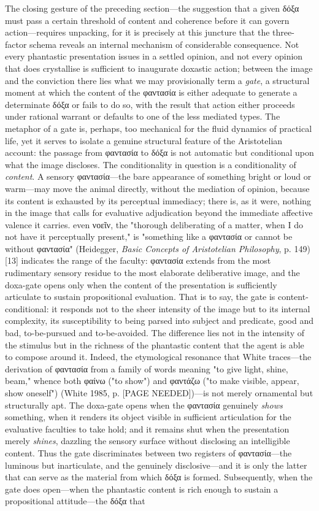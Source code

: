 \documentclass{article}
\begin{document}
The closing gesture of the preceding section—the suggestion that a given δόξα must pass a certain threshold of content and coherence before it can govern action—requires unpacking, for it is precisely at this juncture that the three-factor schema reveals an internal mechanism of considerable consequence. Not every phantastic presentation issues in a settled opinion, and not every opinion that does crystallise is sufficient to inaugurate doxastic action; between the image and the conviction there lies what we may provisionally term a \textit{gate}, a structural moment at which the content of the φαντασία is either adequate to generate a determinate δόξα or fails to do so, with the result that action either proceeds under rational warrant or defaults to one of the less mediated types. The metaphor of a gate is, perhaps, too mechanical for the fluid dynamics of practical life, yet it serves to isolate a genuine structural feature of the Aristotelian account: the passage from φαντασία to δόξα is not automatic but conditional upon what the image discloses. The conditionality in question is a conditionality of \textit{content}. A sensory φαντασία—the bare appearance of something bright or loud or warm—may move the animal directly, without the mediation of opinion, because its content is exhausted by its perceptual immediacy; there is, as it were, nothing in the image that calls for evaluative adjudication beyond the immediate affective valence it carries. even νοεῖν, the "thorough deliberating of a matter, when I do not have it perceptually present," is "something like a φαντασία or cannot be without φαντασία" (Heidegger, \textit{Basic Concepts of Aristotelian Philosophy}, p. 149)[13] indicates the range of the faculty: φαντασία extends from the most rudimentary sensory residue to the most elaborate deliberative image, and the doxa-gate opens only when the content of the presentation is sufficiently articulate to sustain propositional evaluation. That is to say, the gate is content-conditional: it responds not to the sheer intensity of the image but to its internal complexity, its susceptibility to being parsed into subject and predicate, good and bad, to-be-pursued and to-be-avoided. The difference lies not in the intensity of the stimulus but in the richness of the phantastic content that the agent is able to compose around it. Indeed, the etymological resonance that White traces—the derivation of φαντασία from a family of words meaning "to give light, shine, beam," whence both φαίνω ("to show") and φαντάζω ("to make visible, appear, show oneself") (White 1985, p. [PAGE NEEDED])—is not merely ornamental but structurally apt. The doxa-gate opens when the φαντασία genuinely \textit{shows} something, when it renders its object visible in sufficient articulation for the evaluative faculties to take hold; and it remains shut when the presentation merely \textit{shines}, dazzling the sensory surface without disclosing an intelligible content. Thus the gate discriminates between two registers of φαντασία—the luminous but inarticulate, and the genuinely disclosive—and it is only the latter that can serve as the material from which δόξα is formed. Subsequently, when the gate does open—when the phantastic content is rich enough to sustain a propositional attitude—the δόξα that 
\end{document}
